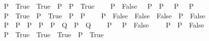 \begin{isabellebody}
\ \ \ \ {\isachardoublequoteopen}{\isacharparenleft}{\kern0pt}P\ {\isasymlongrightarrow}\ True{\isacharparenright}{\kern0pt}\ {\isacharequal}{\kern0pt}\ True{\isachardoublequoteclose}\ \ {\isachardoublequoteopen}{\isacharparenleft}{\kern0pt}P\ {\isasymlongrightarrow}\ P{\isacharparenright}{\kern0pt}\ {\isacharequal}{\kern0pt}\ True{\isachardoublequoteclose}\isanewline
\ \ \ \ {\isachardoublequoteopen}{\isacharparenleft}{\kern0pt}P\ {\isasymlongrightarrow}\ False{\isacharparenright}{\kern0pt}\ {\isacharequal}{\kern0pt}\ {\isacharparenleft}{\kern0pt}{\isasymnot}\ P{\isacharparenright}{\kern0pt}{\isachardoublequoteclose}\ \ {\isachardoublequoteopen}{\isacharparenleft}{\kern0pt}P\ {\isasymlongrightarrow}\ {\isasymnot}\ P{\isacharparenright}{\kern0pt}\ {\isacharequal}{\kern0pt}\ {\isacharparenleft}{\kern0pt}{\isasymnot}\ P{\isacharparenright}{\kern0pt}{\isachardoublequoteclose}\isanewline
\ \ \ \ {\isachardoublequoteopen}{\isacharparenleft}{\kern0pt}P\ {\isasymand}\ True{\isacharparenright}{\kern0pt}\ {\isacharequal}{\kern0pt}\ P{\isachardoublequoteclose}\ \ {\isachardoublequoteopen}{\isacharparenleft}{\kern0pt}True\ {\isasymand}\ P{\isacharparenright}{\kern0pt}\ {\isacharequal}{\kern0pt}\ P{\isachardoublequoteclose}\isanewline
\ \ \ \ {\isachardoublequoteopen}{\isacharparenleft}{\kern0pt}P\ {\isasymand}\ False{\isacharparenright}{\kern0pt}\ {\isacharequal}{\kern0pt}\ False{\isachardoublequoteclose}\ \ {\isachardoublequoteopen}{\isacharparenleft}{\kern0pt}False\ {\isasymand}\ P{\isacharparenright}{\kern0pt}\ {\isacharequal}{\kern0pt}\ False{\isachardoublequoteclose}\isanewline
\ \ \ \ {\isachardoublequoteopen}{\isacharparenleft}{\kern0pt}P\ {\isasymand}\ P{\isacharparenright}{\kern0pt}\ {\isacharequal}{\kern0pt}\ P{\isachardoublequoteclose}\ \ {\isachardoublequoteopen}{\isacharparenleft}{\kern0pt}P\ {\isasymand}\ {\isacharparenleft}{\kern0pt}P\ {\isasymand}\ Q{\isacharparenright}{\kern0pt}{\isacharparenright}{\kern0pt}\ {\isacharequal}{\kern0pt}\ {\isacharparenleft}{\kern0pt}P\ {\isasymand}\ Q{\isacharparenright}{\kern0pt}{\isachardoublequoteclose}\isanewline
\ \ \ \ {\isachardoublequoteopen}{\isacharparenleft}{\kern0pt}P\ {\isasymand}\ {\isasymnot}\ P{\isacharparenright}{\kern0pt}\ {\isacharequal}{\kern0pt}\ False{\isachardoublequoteclose}\ \ \ \ {\isachardoublequoteopen}{\isacharparenleft}{\kern0pt}{\isasymnot}\ P\ {\isasymand}\ P{\isacharparenright}{\kern0pt}\ {\isacharequal}{\kern0pt}\ False{\isachardoublequoteclose}\isanewline
\ \ \ \ {\isachardoublequoteopen}{\isacharparenleft}{\kern0pt}P\ {\isasymor}\ True{\isacharparenright}{\kern0pt}\ {\isacharequal}{\kern0pt}\ True{\isachardoublequoteclose}\ \ {\isachardoublequoteopen}{\isacharparenleft}{\kern0pt}True\ {\isasymor}\ P{\isacharparenright}{\kern0pt}\ {\isacharequal}{\kern0pt}\ True{\isachardoublequoteclose}\isanewline

\end{isabellebody}
